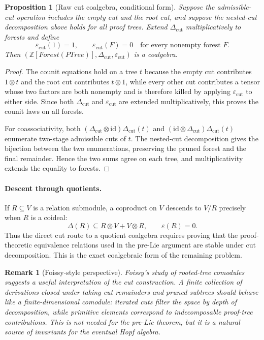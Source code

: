 \documentclass[11pt]{article}
\newtheorem{proposition}[theorem]{Proposition}
\newtheorem{remark}[theorem]{Remark}
\newcommand{\PTree}{\mathit{PTree}}
\newcommand{\Forest}{\mathit{Forest}}
\newcommand{\ZZ}{\mathbb{Z}}
\begin{document}
\begin{proposition}[Raw cut coalgebra, conditional form]
Suppose the admissible-cut operation includes the empty cut and the root cut,
and suppose the nested-cut decomposition above holds for all proof trees.
Extend \(\Delta_{\mathrm{cut}}\) multiplicatively to forests and define
\[
\varepsilon_{\mathrm{cut}}(1)=1,\qquad
\varepsilon_{\mathrm{cut}}(F)=0
\quad\text{for every nonempty forest }F.
\]
Then \((\ZZ[\Forest(\PTree)],\Delta_{\mathrm{cut}},
\varepsilon_{\mathrm{cut}})\) is a coalgebra.
\end{proposition}

\begin{proof}
The counit equations hold on a tree \(t\) because the empty cut contributes
\(1\otimes t\) and the root cut contributes \(t\otimes 1\), while every other
cut contributes a tensor whose two factors are both nonempty and is therefore
killed by applying \(\varepsilon_{\mathrm{cut}}\) to either side.  Since both
\(\Delta_{\mathrm{cut}}\) and \(\varepsilon_{\mathrm{cut}}\) are extended
multiplicatively, this proves the counit laws on all forests.

For coassociativity, both
\((\Delta_{\mathrm{cut}}\otimes\mathrm{id})\Delta_{\mathrm{cut}}(t)\) and
\((\mathrm{id}\otimes\Delta_{\mathrm{cut}})\Delta_{\mathrm{cut}}(t)\)
enumerate two-stage admissible cuts of \(t\).  The nested-cut decomposition
gives the bijection between the two enumerations, preserving the pruned forest
and the final remainder.  Hence the two sums agree on each tree, and
multiplicativity extends the equality to forests.
\end{proof}

\paragraph{Descent through quotients.}
If \(R\subseteq V\) is a relation submodule, a coproduct on \(V\) descends to
\(V/R\) precisely when \(R\) is a coideal:
\[
\Delta(R)\subseteq R\otimes V+V\otimes R,\qquad \varepsilon(R)=0.
\]
Thus the direct cut route to a quotient coalgebra requires proving that the
proof-theoretic equivalence relations used in the pre-Lie argument are stable
under cut decomposition.  This is the exact coalgebraic form of the remaining
problem.

\begin{remark}[Foissy-style perspective]
Foissy's study of rooted-tree comodules suggests a useful interpretation of
the cut construction.  A finite collection of derivations closed under taking
cut remainders and pruned subtrees should behave like a finite-dimensional
comodule: iterated cuts filter the space by depth of decomposition, while
primitive elements correspond to indecomposable proof-tree contributions.
This is not needed for the pre-Lie theorem, but it is a natural source of
invariants for the eventual Hopf algebra.
\end{remark}
\end{document}

